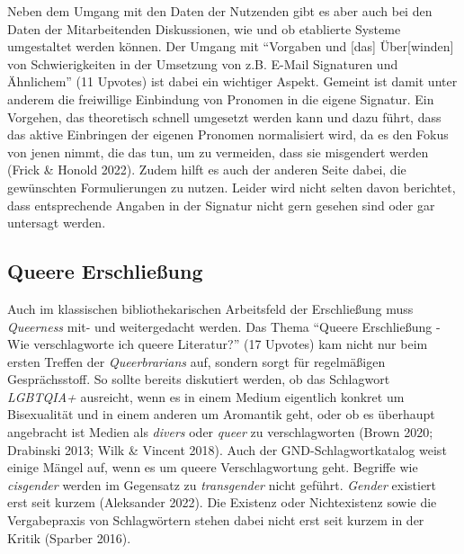 \documentclass[a4paper,
fontsize=11pt,
oneside,
numbers=noperiodatend,
parskip=half-,
bibliography=totoc,
final
]{scrartcl}
\begin{document}
Neben dem Umgang mit den Daten der Nutzenden gibt es aber auch bei den
Daten der Mitarbeitenden Diskussionen, wie und ob etablierte Systeme
umgestaltet werden können. Der Umgang mit \enquote{Vorgaben und
{[}das{]} Über{[}winden{]} von Schwierigkeiten in der Umsetzung von z.B.
E-Mail Signaturen und Ähnlichem} (11 Upvotes) ist dabei ein wichtiger
Aspekt. Gemeint ist damit unter anderem die freiwillige Einbindung von
Pronomen in die eigene Signatur. Ein Vorgehen, das theoretisch schnell
umgesetzt werden kann und dazu führt, dass das aktive Einbringen der
eigenen Pronomen normalisiert wird, da es den Fokus von jenen nimmt, die
das tun, um zu vermeiden, dass sie misgendert werden (Frick \& Honold
2022). Zudem hilft es auch der anderen Seite dabei, die gewünschten
Formulierungen zu nutzen. Leider wird nicht selten davon berichtet, dass
entsprechende Angaben in der Signatur nicht gern gesehen sind oder gar
untersagt werden.

\subsection{Queere Erschließung}\label{queere-erschlieuxdfung}

Auch im klassischen bibliothekarischen Arbeitsfeld der Erschließung muss
\emph{Queerness} mit- und weitergedacht werden. Das Thema
\enquote{Queere Erschließung - Wie verschlagworte ich queere Literatur?}
(17 Upvotes) kam nicht nur beim ersten Treffen der \emph{Queerbrarians}
auf, sondern sorgt für regelmäßigen Gesprächsstoff. So sollte bereits
diskutiert werden, ob das Schlagwort \emph{LGBTQIA+} ausreicht, wenn es
in einem Medium eigentlich konkret um Bisexualität und in einem anderen
um Aromantik geht, oder ob es überhaupt angebracht ist Medien als
\emph{divers} oder \emph{queer} zu verschlagworten (Brown 2020;
Drabinski 2013; Wilk \& Vincent 2018). Auch der GND-Schlagwort\-katalog
weist einige Mängel auf, wenn es um queere Verschlagwortung geht.
Begriffe wie \emph{cisgender} werden im Gegensatz zu \emph{transgender}
nicht geführt. \emph{Gender} existiert erst seit kurzem (Aleksander
2022). Die Existenz oder Nichtexistenz sowie die Vergabepraxis von
Schlagwörtern stehen dabei nicht erst seit kurzem in der Kritik (Sparber
2016).
\end{document}
